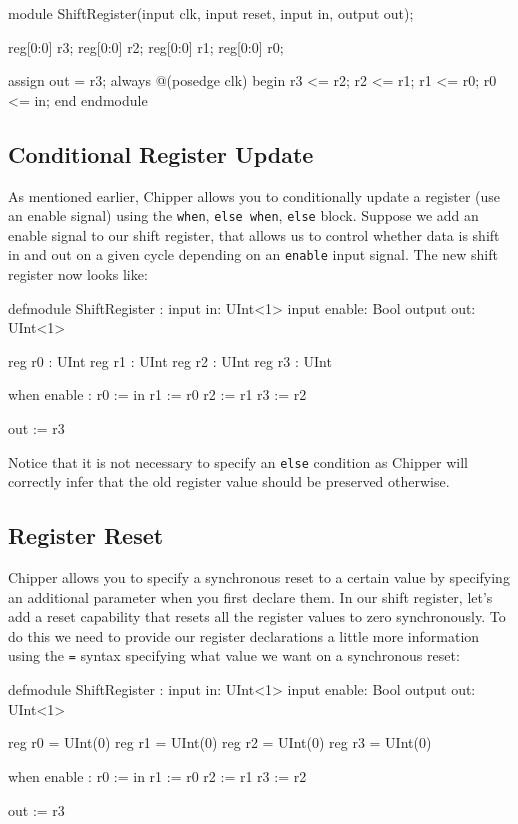 \begin{bash}
module ShiftRegister(input clk, input reset,
    input  in,
    output out);

  reg[0:0] r3;
  reg[0:0] r2;
  reg[0:0] r1;
  reg[0:0] r0;

  assign out = r3;
  always @(posedge clk) begin
    r3 <= r2;
    r2 <= r1;
    r1 <= r0;
    r0 <= in;
  end
endmodule
\end{bash}

\subsection{Conditional Register Update}

As mentioned earlier, Chipper allows you to conditionally update a register (use an enable signal) using the \verb+when+, \verb+else when+, \verb+else+ block. Suppose we add an enable signal to our shift register, that allows us to control whether data is shift in and out on a given cycle depending on an \verb+enable+ input signal. The new shift register now looks like:

\begin{stanza}
defmodule ShiftRegister :
  input  in:     UInt<1>
  input  enable: Bool
  output out:    UInt<1>

  reg r0 : UInt
  reg r1 : UInt
  reg r2 : UInt
  reg r3 : UInt

  when enable :
    r0 := in
    r1 := r0
    r2 := r1
    r3 := r2

  out := r3
\end{stanza}

Notice that it is not necessary to specify an \verb+else+ condition as Chipper will correctly infer that the old register value should be preserved otherwise.

\subsection{Register Reset}

Chipper allows you to specify a synchronous reset to a certain value by specifying an additional parameter when you first declare them. In our shift register, let's add a reset capability that resets all the register values to zero synchronously. To do this we need to provide our register declarations a little more information using the \verb+=+ syntax specifying what value we want on a synchronous reset:

\begin{stanza}
defmodule ShiftRegister :
  input  in:     UInt<1>
  input  enable: Bool
  output out:    UInt<1>

  reg r0 = UInt(0)
  reg r1 = UInt(0)
  reg r2 = UInt(0)
  reg r3 = UInt(0)

  when enable :
    r0 := in
    r1 := r0
    r2 := r1
    r3 := r2

  out := r3
\end{stanza}

